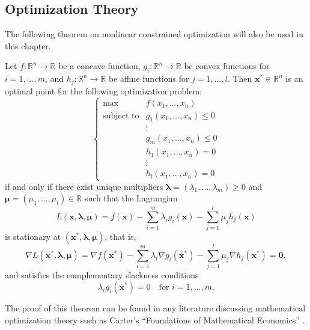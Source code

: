 \subsection{Optimization Theory} %
\label{sub:notation_optimisation_theory}
The following theorem on nonlinear constrained optimization will also be used in this chapter.
\begin{thm}
Let $f:\mathbb{R}^n\to\mathbb{R}$ be a concave function, $g_i:\mathbb{R}^n\to\mathbb{R}$ be convex functions for $i=1,\ldots,m$, and $h_j:\mathbb{R}^n\to\mathbb{R}$ be affine functions for $j=1,\ldots,l$. Then $\mathbf{x}^*\in\mathbb{R}^n$ is an optimal point for the following optimization problem:
\begin{equation*}
	\left\{
	\begin{array}{rl}
		\max &f(x_1,\ldots,x_n)\\
		\text{subject to} &g_1(x_1,\ldots,x_n)\le 0\\
		& \vdots\\
		&g_m(x_1,\ldots,x_n)\le 0\\
		&h_1(x_1,\ldots,x_n) = 0\\
		& \vdots\\
		&h_l(x_1,\ldots,x_n) = 0
	\end{array}
	\right.
\end{equation*}
if and only if there exist unique multipliers $\bm{\lambda}=(\lambda_1,\ldots,\lambda_m)\ge 0$ and $\bm{\mu}=(\mu_1,\ldots,\mu_l)\in\mathbb{R}$ such that the Lagrangian
\begin{equation*}
	L(\mathbf{x},\bm{\lambda},\bm{\mu}) = f(\mathbf{x}) - \sum_{i=1}^m\lambda_i g_i(\mathbf{x}) - \sum_{j=1}^l\mu_j h_j(\mathbf{x})
\end{equation*}
is stationary at $(\mathbf{x}^*,\bm{\lambda},\bm{\mu})$, that is,
\begin{equation*}
	\nabla L(\mathbf{x}^*,\bm{\lambda},\bm{\mu}) = \nabla f(\mathbf{x}^*) - \sum_{i=1}^m\lambda_i \nabla g_i(\mathbf{x}^*) - \sum_{j=1}^l\mu_j \nabla h_j(\mathbf{x}^*) = \mathbf{0},
\end{equation*}
and satisfies the complementary slackness conditions
\begin{equation*}
	\lambda_i g_i(\mathbf{x}^*)=0 \quad\text{for } i=1,\ldots,m.
\end{equation*}
\end{thm}
\noindent The proof of this theorem can be found in any literature discussing mathematical optimization theory such as Carter's ``Foundations of Mathematical Economics'' \cite{Carter2001}.

